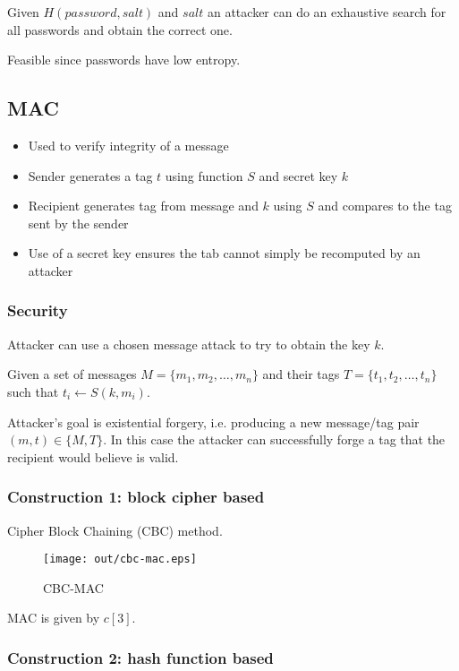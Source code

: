 \documentclass[a4paper]{article}
\begin{document}
Given $H(password, salt)$ and $salt$ an attacker can do an exhaustive search for
all passwords and obtain the correct one.

Feasible since passwords have low entropy.

\subsection{MAC}

\begin{itemize}
  \item Used to verify integrity of a message
  \item Sender generates a tag $t$ using function $S$ and secret key $k$
  \item Recipient generates tag from message and $k$ using $S$ and compares to
        the tag sent by the sender
  \item Use of a secret key ensures the tab cannot simply be recomputed by an
        attacker
\end{itemize}

\subsubsection{Security}

Attacker can use a chosen message attack to try to obtain the key $k$.

Given a set of messages $M = \{m_{1}, m_{2}, \ldots, m_{n}\}$ and their tags $T
= \{t_{1}, t_{2}, \ldots, t_{n}\}$ such that $t_{i} \leftarrow S(k, m_{i})$.

Attacker's goal is existential forgery, i.e. producing a new message/tag pair
$(m, t) \in \{M, T\}$. In this case the attacker can successfully forge a tag
that the recipient would believe is valid.

\subsubsection{Construction 1: block cipher based}

Cipher Block Chaining (CBC) method.

\begin{figure}[h!]
  \centering
  \texttt{[image: out/cbc-mac.eps]}
  \caption{CBC-MAC}
  \label{fig:cbc-mac}
\end{figure}
\FloatBarrier

MAC is given by $c[3]$.

\subsubsection{Construction 2: hash function based}
\end{document}
